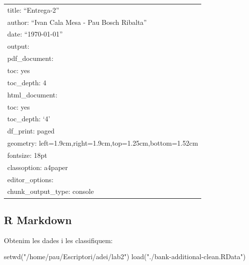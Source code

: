 \documentclass[
]{article}
\author{}
\date{\vspace{-2.5em}}
\newenvironment{Shaded}{\begin{snugshade}}{\end{snugshade}}
\newcommand{\FunctionTok}[1]{\textcolor[rgb]{0.00,0.00,0.00}{#1}}
\newcommand{\NormalTok}[1]{#1}
\newcommand{\StringTok}[1]{\textcolor[rgb]{0.31,0.60,0.02}{#1}}
\begin{document}
{
\setcounter{tocdepth}{4}
\tableofcontents
}
\begin{longtable}[]{@{}l@{}}
\toprule()
\endhead
title: ``Entrega-2'' \\
author: ``Ivan Cala Mesa - Pau Bosch Ribalta'' \\
date: ``\today'' \\
output: \\
pdf\_document: \\
toc: yes \\
toc\_depth: 4 \\
html\_document: \\
toc: yes \\
toc\_depth: `4' \\
df\_print: paged \\
geometry: left=1.9cm,right=1.9cm,top=1.25cm,bottom=1.52cm \\
fontsize: 18pt \\
classoption: a4paper \\
editor\_options: \\
chunk\_output\_type: console \\
\bottomrule()
\end{longtable}

\hypertarget{r-markdown}{%
\subsection{R Markdown}\label{r-markdown}}

Obtenim les dades i les classifiquem:

\begin{Shaded}
\begin{Highlighting}[]
\FunctionTok{setwd}\NormalTok{(}\StringTok{"/home/pau/Escriptori/adei/lab2"}\NormalTok{)}
\FunctionTok{load}\NormalTok{(}\StringTok{"./bank{-}additional{-}clean.RData"}\NormalTok{)}
\end{Highlighting}
\end{Shaded}
\end{document}
